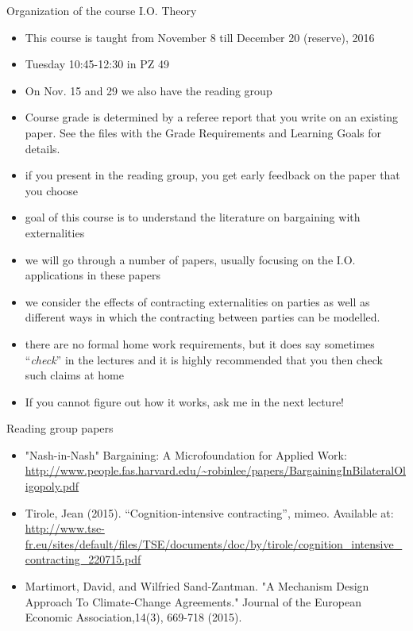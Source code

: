 \documentclass[11pt,english]{beamer}
\begin{document}
\begin{frame}[allowframebreaks]{Organization of the course I.O. Theory}
  \begin{itemize}
  \item This course is taught from November 8 till December 20 (reserve), 2016
  \item Tuesday 10:45-12:30 in PZ 49
  \item On Nov. 15 and 29 we also have the reading group
  \item Course grade is determined by a referee report that you write
    on an existing paper. See the files with the Grade Requirements
    and Learning Goals for details.
  \item if you present in the reading group, you get early feedback on the paper
    that you choose
  \item goal of this course is to understand the literature on
    bargaining with externalities
  \item we will go through a number of papers, usually focusing on the
    I.O. applications in these papers
  \item we consider the effects of contracting externalities on
    parties as well as different ways in which the contracting between
    parties can be modelled.
  \item there are no formal home work requirements, but it does say
    sometimes ``\emph{check}'' in the lectures and it is highly recommended
    that you then check such claims at home
  \item If you cannot figure out how it works, ask me in the next
    lecture!
  \end{itemize}
\end{frame}

\begin{frame}{Reading group papers}
  \begin{itemize}
  \item "Nash-in-Nash" Bargaining: A Microfoundation for Applied Work:
    \url{http://www.people.fas.harvard.edu/~robinlee/papers/BargainingInBilateralOligopoly.pdf}
  \item Tirole, Jean (2015). “Cognition-intensive contracting”, mimeo. Available
  at:
  \url{http://www.tse-fr.eu/sites/default/files/TSE/documents/doc/by/tirole/cognition_intensive_contracting_220715.pdf}
  \item Martimort, David, and Wilfried Sand‐Zantman. "A Mechanism Design Approach To Climate‐Change Agreements." Journal of the European Economic Association,14(3), 669-718 (2015).
  \end{itemize}
\end{frame}
\end{document}
